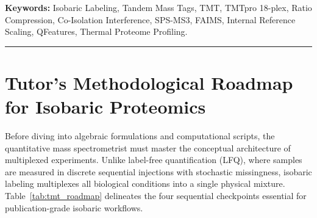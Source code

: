 \documentclass[11pt,oneside]{book}
\begin{document}
\noindent
\textbf{Keywords:} Isobaric Labeling, Tandem Mass Tags, TMT, TMTpro 18-plex, Ratio Compression, Co-Isolation Interference, SPS-MS3, FAIMS, Internal Reference Scaling, QFeatures, Thermal Proteome Profiling.

\vspace{1em}
\noindent\rule{\textwidth}{0.8pt}

\section{Tutor's Methodological Roadmap for Isobaric Proteomics}

Before diving into algebraic formulations and computational scripts, the quantitative mass spectrometrist must master the conceptual architecture of multiplexed experiments. Unlike label-free quantification (LFQ), where samples are measured in discrete sequential injections with stochastic missingness, isobaric labeling multiplexes all biological conditions into a single physical mixture. Table~\ref{tab:tmt_roadmap} delineates the four sequential checkpoints essential for publication-grade isobaric workflows.
\end{document}
